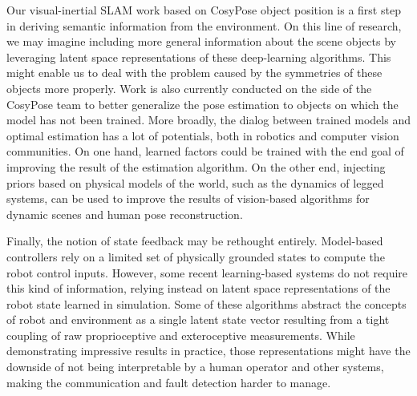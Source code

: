 Our visual-inertial SLAM work based on CosyPose object position is a first step in deriving semantic information from the environment. On this line of research, we may imagine
including more general information about the scene objects by leveraging latent space representations of these deep-learning algorithms. This might enable us to deal with the problem
caused by the symmetries of these objects more properly. Work is also currently conducted on the side of the CosyPose team to better generalize the pose estimation to objects on which the 
model has not been trained. More broadly, the dialog between trained models and optimal estimation has a lot of potentials, both in robotics
and computer vision communities. On one hand, learned factors could be trained with the end goal of improving the result of the estimation algorithm. On the other end,
injecting priors based on physical models of the world, such as the dynamics of legged systems, can be used to improve the results of vision-based algorithms
for dynamic scenes and human pose reconstruction.


Finally, the notion of state feedback may be rethought entirely. Model-based controllers rely on a limited set of physically grounded states to compute the robot control inputs. 
However, some recent learning-based systems do not require this kind of information, relying instead on latent space representations of the robot state learned
in simulation. Some of these algorithms abstract the concepts of robot and environment as a single latent state vector resulting from a tight coupling of raw proprioceptive and exteroceptive
measurements. While demonstrating impressive results in practice, those representations might have the downside of not being interpretable by a human operator and other systems, 
making the communication and fault detection harder to manage.  


